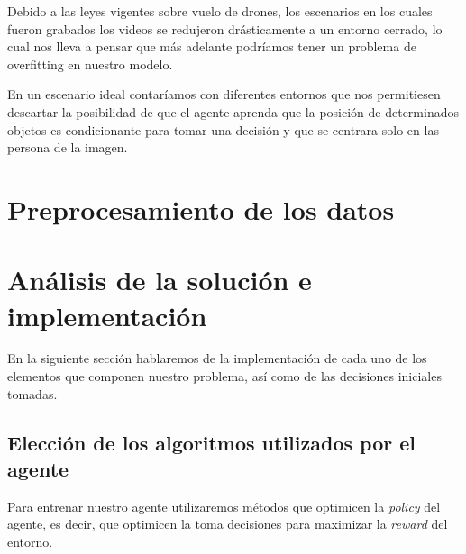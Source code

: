 Debido a las leyes vigentes sobre vuelo de drones, los escenarios en los cuales fueron grabados los videos se redujeron drásticamente a un entorno cerrado, lo cual nos lleva a pensar que más adelante podríamos tener un problema de overfitting en nuestro modelo.
\medskip

En un escenario ideal contaríamos con diferentes entornos que nos permitiesen descartar la posibilidad de que el agente aprenda que la posición de determinados objetos es condicionante para tomar una decisión y que se centrara solo en las persona de la imagen.
\medskip

\section{Preprocesamiento de los datos}
\label{preprocesamiento-datos}


\section{Análisis de la solución e implementación}
\label{analisis-de-la-solucion-e-implementacion}

En la siguiente sección hablaremos de la implementación de cada uno de los elementos que componen nuestro problema, así como de las decisiones iniciales tomadas.
\subsection{Elección de los algoritmos utilizados por el agente}
\label{eleccion-de-algoritmos}

Para entrenar nuestro agente utilizaremos métodos que optimicen la \textit{policy} del agente, es decir, que optimicen la toma decisiones para maximizar la \textit{reward} del entorno.
\medskip

